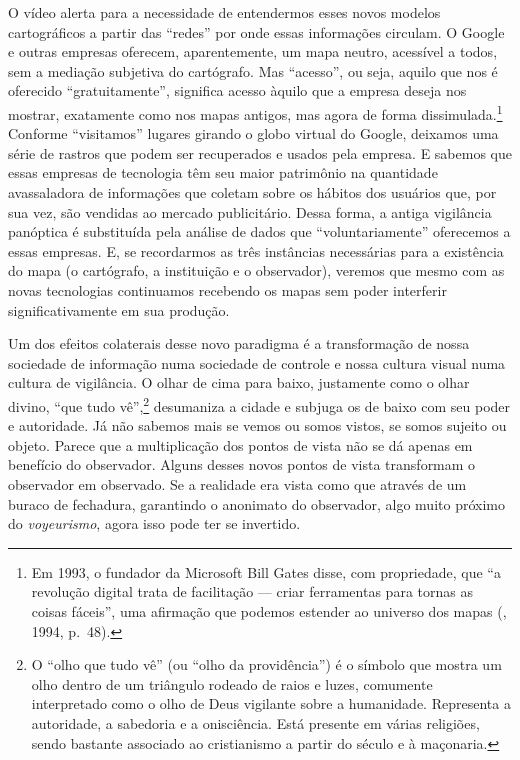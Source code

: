 O vídeo alerta para a necessidade de entendermos esses novos modelos
cartográficos a partir das ``redes'' por onde essas informações \label{vigilancia}
circulam. O Google e outras empresas oferecem, aparentemente, um mapa
neutro, acessível a todos, sem a mediação subjetiva do cartógrafo. Mas
``acesso'', ou seja, aquilo que nos é oferecido ``gratuitamente'',
significa acesso àquilo que a empresa deseja nos mostrar, exatamente
como nos mapas antigos, mas agora de forma dissimulada.\footnote{Em
  1993, o fundador da Microsoft Bill Gates disse, com propriedade, que
  ``a revolução digital trata de facilitação --- criar ferramentas para
  tornas as coisas fáceis'', uma afirmação que
  podemos estender ao universo dos mapas (, 1994, p.~48).} Conforme
``visitamos'' lugares girando o globo virtual do Google, deixamos uma
série de rastros que podem ser recuperados e usados pela empresa. E
sabemos que essas empresas de tecnologia têm seu maior patrimônio na
quantidade avassaladora de informações que coletam sobre os hábitos dos
usuários que, por sua vez, são vendidas ao mercado publicitário.
Dessa forma, a antiga vigilância panóptica é substituída pela análise
de dados que ``voluntariamente'' oferecemos a essas empresas. E, se
recordarmos as três instâncias necessárias para a existência do mapa (o
cartógrafo, a instituição e o observador), veremos que mesmo com as
novas tecnologias continuamos recebendo os mapas sem poder interferir
significativamente em sua produção.

Um dos efeitos colaterais desse novo paradigma é a transformação de
nossa sociedade de informação numa sociedade de controle e nossa cultura
visual numa cultura de vigilância. O olhar de cima para baixo,
justamente como o olhar divino, ``que tudo vê'',\footnote{O ``olho que tudo
  vê'' (ou ``olho da providência'') é o símbolo que mostra um olho
  dentro de um triângulo rodeado de raios e luzes, comumente
  interpretado como o olho de Deus vigilante sobre a humanidade.
  Representa a autoridade, a sabedoria e a onisciência. Está presente em
  várias religiões, sendo bastante associado ao cristianismo a partir do
  século  e à maçonaria.} desumaniza a cidade e subjuga os de
baixo com seu poder e autoridade. Já não sabemos mais se vemos ou somos
vistos, se somos sujeito ou objeto. Parece que a multiplicação dos
pontos de vista não se dá apenas em benefício do observador. Alguns
desses novos pontos de vista transformam o observador em observado. Se a
realidade era vista como que através de um buraco de fechadura,
garantindo o anonimato do observador, algo muito próximo do
\emph{voyeurismo}, agora isso pode ter se invertido.

